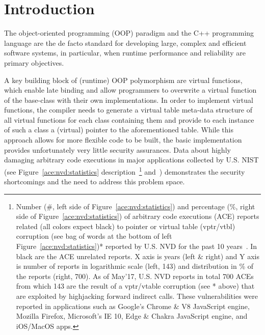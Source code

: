 \section{Introduction}
\label{chapter:Introduction}

The object-oriented programming (OOP) paradigm and the C++ programming language are the de facto standard for developing large, complex and efficient software systems, in particular, 
when runtime performance and reliability are primary objectives.

A key building block of (runtime) OOP polymorphism are virtual functions, which enable late binding and allow programmers to overwrite a virtual function of the base-class with their 
own implementations. In order to implement virtual functions, the compiler needs to generate a virtual table meta-data structure of all virtual functions for each class containing 
them and provide to each instance of such a class a (virtual) pointer to the aforementioned table. While this approach allows for more flexible code to be built, 
the basic implementation provides unfortunately very little security assurances. Data about highly damaging arbitrary code executions in major applications collected by U.S. NIST 
(see Figure~\ref{ace:nvd:statistics} description~\footnote{Number (\#, left side of Figure~\ref{ace:nvd:statistics}) and percentage (\%, right side of Figure~\ref{ace:nvd:statistics}) 
of arbitrary code executions (ACE) reports related (all colors expect black) to pointer or virtual table (vptr/vtbl) corruption 
(see bag of words at the bottom of left Figure~\ref{ace:nvd:statistics})* reported by U.S. NVD for the past 10 years~\cite{NVD:ACE}. In black are the ACE unrelated reports.
X axis is years (left \& right) and Y axis is number of reports in logarithmic scale (left, 143) and distribution in \% of the reports (right, 700).
As of May'17, U.S. NVD reports in total 700 ACEs from which 143 are the result of a vptr/vtable corruption (see * above) that are exploited by highjacking forward indirect calls.
These vulnerabilities were reported in applications such as Google's Chrome \& V8 JavaScript engine, Mozilla Firefox, Microsoft's IE 10, Edge \& Chakra JavaScript engine, and iOS/MacOS apps.} 
and~\cite{NVD:ACE}) demonstrates the security shortcomings and the need to address this problem space.


